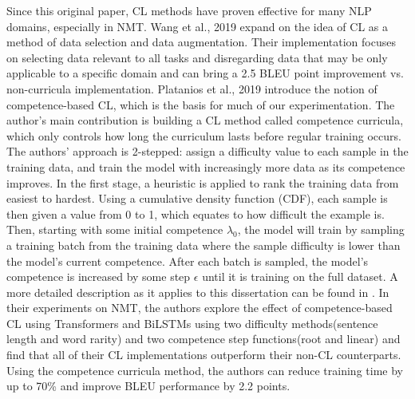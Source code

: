 Since this original paper, CL methods have proven effective for many NLP domains, especially in NMT. Wang et al., 2019 \cite{Wang2019LearningAM} expand on the idea of CL as a method of data selection and data augmentation. Their implementation focuses on selecting data relevant to all tasks and disregarding data that may be only applicable to a specific domain and can bring a 2.5 BLEU point improvement vs. non-curricula implementation. Platanios et al., 2019 \cite{Platanios2019CompetencebasedCL} introduce the notion of competence-based CL, which is the basis for much of our experimentation. The author's main contribution is building a CL method called competence curricula, which only controls how long the curriculum lasts before regular training occurs. The authors' approach is 2-stepped: assign a difficulty value to each sample in the training data, and train the model with increasingly more data as its competence improves. In the first stage, a heuristic is applied to rank the training data from easiest to hardest. Using a cumulative density function (CDF), each sample is then given a value from 0 to 1, which equates to how difficult the example is. Then, starting with some initial competence $\lambda_0$, the model will train by sampling a training batch from the training data where the sample difficulty is lower than the model's current competence. After each batch is sampled, the model's competence is increased by some step $\epsilon$ until it is training on the full dataset. A more detailed description as it applies to this dissertation can be found in . In their experiments on NMT, the authors explore the effect of competence-based CL using Transformers and BiLSTMs using two difficulty methods(sentence length and word rarity) and two competence step functions(root and linear) and find that all of their CL implementations outperform their non-CL counterparts. Using the competence curricula method, the authors can reduce training time by up to 70\% and improve BLEU performance by 2.2 points. 